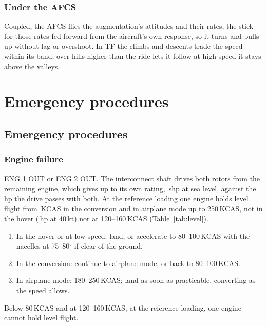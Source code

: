 \documentclass[11pt,a4paper,oneside]{book}
\newcommand{\ann}[1]{\textsf{#1}}
\begin{document}
\section{Under the AFCS}
Coupled, the AFCS flies the augmentation's attitudes and their rates, the stick for those rates fed forward from the
aircraft's own response, so it turns and pulls up without lag or overshoot. In TF the climbs and descents trade the
speed within its band; over hills higher than the ride lets it follow at high speed it stays above the valleys.

\part{Emergency procedures}
\chapter{Emergency procedures}
\section{Engine failure}
\ann{ENG 1 OUT} or \ann{ENG 2 OUT}. The interconnect shaft drives both rotors from the remaining engine, which gives
up to its own rating, \MPmrp\,shp at sea level, against the \MPxmsn\,hp the drive passes with both. At the reference
loading one engine holds level flight from \MOeiLo\,KCAS in the conversion and in airplane mode up to 250\,KCAS, not
in the hover (\MOeiHoverPower\,hp at 40\,kt) nor at 120--160\,KCAS (Table~\ref{tab:level}).
\begin{enumerate}
\item In the hover or at low speed: land, or accelerate to 80--100\,KCAS with the nacelles at 75--80$^\circ$ if clear of
the ground.
\item In the conversion: continue to airplane mode, or back to 80--100\,KCAS.
\item In airplane mode: 180--250\,KCAS; land as soon as practicable, converting as the speed allows.
\end{enumerate}
\begin{warning}
Below 80\,KCAS and at 120--160\,KCAS, at the reference loading, one engine cannot hold level flight.
\end{warning}
\end{document}
